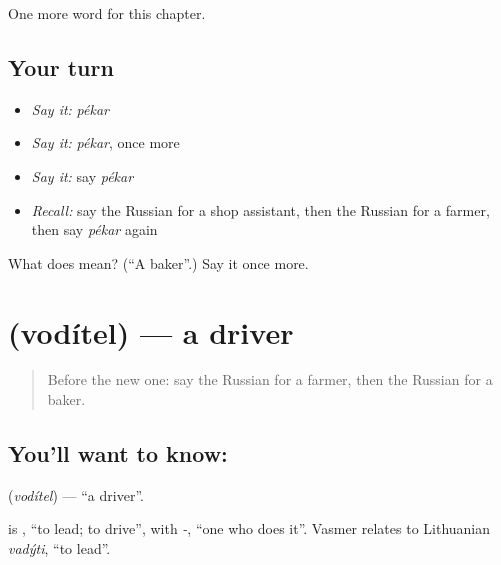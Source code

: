 \begin{grammarlens}[title={What you've built}]
One more word for this chapter.
\end{grammarlens}

\subsection*{Your turn}
\begin{itemize}
\raggedright
  \item \emph{Say it:} \emph{pékar}
  \item \emph{Say it:} \emph{pékar}, once more
  \item \emph{Say it:} say \emph{pékar}
  \item \emph{Recall:} say the Russian for a shop assistant, then the Russian for a farmer, then say \emph{pékar} again
\end{itemize}

\begin{tcolorbox}[breakable,colback=teal!4,colframe=teal!35!black,title={Before you move on}]
What does  mean? (\textquotedblleft{}A baker\textquotedblright{}.) Say it once more.
\end{tcolorbox}
\section[\texorpdfstring{\ru{водитель} (vodítel)}{водитель (vodítel)}]{ (vodítel) — a driver}

\label{lesson:RU-C108-driver}



\begin{quote}
Before the new one: say the Russian for a farmer, then the Russian for a baker.
\end{quote}

\subsection*{You'll want to know: }
\textbf{} (\emph{vodítel}) — \textquotedblleft{}a driver\textquotedblright{}.

\begin{cousinweb}
\textbf{} is \emph{}, \textquotedblleft{}to lead; to drive\textquotedblright{}, with \emph{-}, \textquotedblleft{}one who does it\textquotedblright{}. Vasmer relates \emph{} to Lithuanian \emph{vadýti}, \textquotedblleft{}to lead\textquotedblright{}.
\end{cousinweb}

